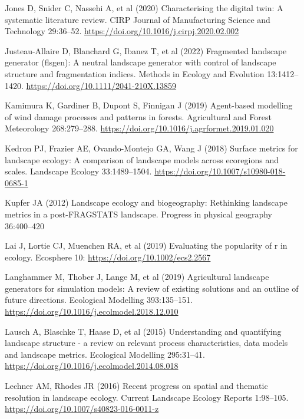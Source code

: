\documentclass[
  10pt,
  a4paperpaper,
]{article}
\newlength{\cslhangindent}
\newenvironment{CSLReferences}[2] %
 {\begin{list}{}{%
  \setlength{\itemindent}{0pt}
  \setlength{\leftmargin}{0pt}
  \setlength{\parsep}{0pt}
  \ifodd #1
   \setlength{\leftmargin}{\cslhangindent}
   \setlength{\itemindent}{-1\cslhangindent}
  \fi
  \setlength{\itemsep}{#2\baselineskip}}}
 {\end{list}}
\begin{document}
\begin{CSLReferences}{1}{1}
Jones D, Snider C, Nassehi A, et al (2020) Characterising the digital
twin: A systematic literature review. CIRP Journal of Manufacturing
Science and Technology 29:36--52.
\url{https://doi.org/10.1016/j.cirpj.2020.02.002}

Justeau-Allaire D, Blanchard G, Ibanez T, et al (2022) Fragmented
landscape generator (flsgen): A neutral landscape generator with control
of landscape structure and fragmentation indices. Methods in Ecology and
Evolution 13:1412--1420. \url{https://doi.org/10.1111/2041-210X.13859}

Kamimura K, Gardiner B, Dupont S, Finnigan J (2019) Agent-based
modelling of wind damage processes and patterns in forests. Agricultural
and Forest Meteorology 268:279--288.
\url{https://doi.org/10.1016/j.agrformet.2019.01.020}

Kedron PJ, Frazier AE, Ovando-Montejo GA, Wang J (2018) Surface metrics
for landscape ecology: A comparison of landscape models across
ecoregions and scales. Landscape Ecology 33:1489--1504.
\url{https://doi.org/10.1007/s10980-018-0685-1}

Kupfer JA (2012) Landscape ecology and biogeography: Rethinking
landscape metrics in a post-FRAGSTATS landscape. Progress in physical
geography 36:400--420

Lai J, Lortie CJ, Muenchen RA, et al (2019) Evaluating the popularity of
r in ecology. Ecosphere 10: \url{https://doi.org/10.1002/ecs2.2567}

Langhammer M, Thober J, Lange M, et al (2019) Agricultural landscape
generators for simulation models: A review of existing solutions and an
outline of future directions. Ecological Modelling 393:135--151.
\url{https://doi.org/10.1016/j.ecolmodel.2018.12.010}

Lausch A, Blaschke T, Haase D, et al (2015) Understanding and
quantifying landscape structure - a review on relevant process
characteristics, data models and landscape metrics. Ecological Modelling
295:31--41. \url{https://doi.org/10.1016/j.ecolmodel.2014.08.018}

Lechner AM, Rhodes JR (2016) Recent progress on spatial and thematic
resolution in landscape ecology. Current Landscape Ecology Reports
1:98--105. \url{https://doi.org/10.1007/s40823-016-0011-z}


\end{CSLReferences}
\end{document}

